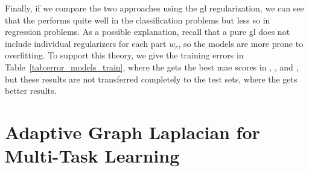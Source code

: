 %
Finally, if we compare the two approaches using the \acrshort{gl} regularization, we can see that the  performs quite well in the classification problems but less so in regression problems. As a possible explanation, recall that a pure \acrshort{gl} does not include individual regularizers for each part $w_r$, so the models are more prone to overfitting. To support this theory, we give the training errors in Table~\ref{tab:error_models_train}, where the  gets the best \acrshort{mae} scores in , ,  and , but these results are not transferred completely to the test sets, where the  gets better results.
%

























\section{Adaptive Graph Laplacian for Multi-Task Learning}\label{sec:adapconvexgl_experiments}


